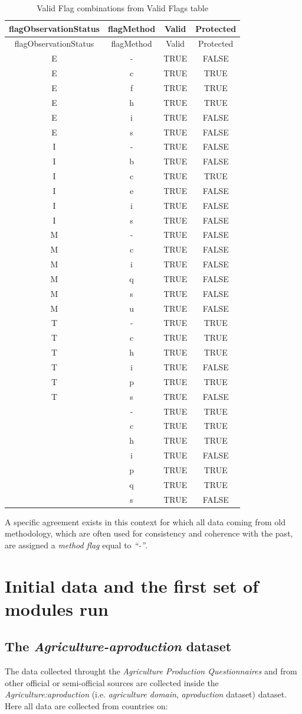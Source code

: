 \documentclass[]{article}
\begin{document}
\begin{longtable}[]{@{}cccc@{}}
\caption{Valid Flag combinations from Valid Flags table}\tabularnewline
\toprule
flagObservationStatus & flagMethod & Valid & Protected\tabularnewline
\midrule
\endfirsthead
\toprule
flagObservationStatus & flagMethod & Valid & Protected\tabularnewline
\midrule
\endhead
E & - & TRUE & FALSE\tabularnewline
E & c & TRUE & TRUE\tabularnewline
E & f & TRUE & TRUE\tabularnewline
E & h & TRUE & TRUE\tabularnewline
E & i & TRUE & FALSE\tabularnewline
E & s & TRUE & FALSE\tabularnewline
I & - & TRUE & FALSE\tabularnewline
I & b & TRUE & FALSE\tabularnewline
I & c & TRUE & TRUE\tabularnewline
I & e & TRUE & FALSE\tabularnewline
I & i & TRUE & FALSE\tabularnewline
I & s & TRUE & FALSE\tabularnewline
M & - & TRUE & FALSE\tabularnewline
M & c & TRUE & FALSE\tabularnewline
M & i & TRUE & FALSE\tabularnewline
M & q & TRUE & FALSE\tabularnewline
M & s & TRUE & FALSE\tabularnewline
M & u & TRUE & FALSE\tabularnewline
T & - & TRUE & TRUE\tabularnewline
T & c & TRUE & TRUE\tabularnewline
T & h & TRUE & TRUE\tabularnewline
T & i & TRUE & FALSE\tabularnewline
T & p & TRUE & TRUE\tabularnewline
T & s & TRUE & FALSE\tabularnewline
& - & TRUE & TRUE\tabularnewline
& c & TRUE & TRUE\tabularnewline
& h & TRUE & TRUE\tabularnewline
& i & TRUE & FALSE\tabularnewline
& p & TRUE & TRUE\tabularnewline
& q & TRUE & TRUE\tabularnewline
& s & TRUE & FALSE\tabularnewline
\bottomrule
\end{longtable}

A specific agreement exists in this context for which all data coming
from old methodology, which are often used for consistency and coherence
with the past, are assigned a \emph{method flag} equal to \emph{``-''}.

\section{Initial data and the first set of modules
run}\label{initial-data-and-the-first-set-of-modules-run}

\subsection{\texorpdfstring{The \emph{Agriculture-aproduction}
dataset}{The Agriculture-aproduction dataset}}\label{the-agriculture-aproduction-dataset}

The data collected throught the \emph{Agriculture Production
Questionnaires} and from other official or semi-official sources are
collected inside the \emph{Agriculture:aproduction} (i.e.
\emph{agriculture domain}, \emph{aproduction} dataset) dataset. Here all
data are collected from countries on:
\end{document}

